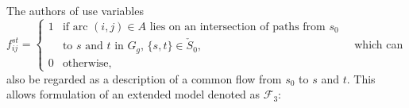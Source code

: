 The authors of \cite{Polzin} use variables
\newline\newline
$f^{st}_{ij}=
\begin{cases}
    1 & \text{if arc $(i,j) \in A$ lies on an intersection of  paths from $s_0$ } \\
    ~ & \text{to $s$ and $t$ in $G_g$, $\{s,t\}\in \check{S}_0$},\\
    0 & \text{otherwise},
\end{cases}$
\newline\newline
which can also be regarded as a description of a common flow from $s_0$ to $s$ and $t$.
%
%
This allows formulation of an extended model denoted as $\mathcal{F}_3$: 
